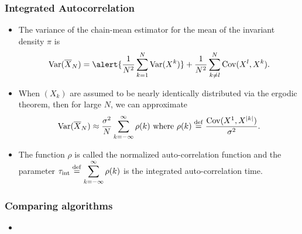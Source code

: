 \documentclass[]{beamer}
\renewcommand{\bar}{\overline}
\newcommand{\eqdef}{\stackrel{\rm def}{=}}
\begin{document}
\begin{frame}[t]
  \frametitle{Integrated Autocorrelation}
  \begin{itemize}
  \itemsep 1.2em
  \item The variance of the chain-mean estimator for the mean of the invariant density $\pi$ is
  $$
    {\rm Var}(\bar X_N) = \alert{\frac{1}{N^2}\sum_{k=1}^N{\rm Var}(X^k)}+\frac{1}{N^2}\sum_{k\neq l}^N {\rm Cov}(X^l,X^k).
  $$
  \item When $(X_k)$ are assumed to be nearly \alert{identically distributed} via the ergodic theorem, then for large $N$, we can approximate
  $$
    {\rm Var}(\bar X_N) \approx \frac{\sigma^2}{N}\sum_{k=-\infty}^\infty \rho(k) \text{ where }  \rho(k) \eqdef \frac{\mathrm{Cov}(X^1, X^{|k|})}{\sigma^2}.
  $$
  \item The function $\rho$ is called the \alert{normalized auto-correlation function} and the parameter $\displaystyle{\tau_{\rm int}\eqdef \sum_{k=-\infty}^\infty \rho(k)}$ is the \alert{integrated auto-correlation time}.
  \end{itemize}
  
\end{frame}
\begin{frame}[t]
  \frametitle{Comparing algorithms}
  \begin{itemize}
    \item 
  \end{itemize}
  
\end{frame}
\end{document}
